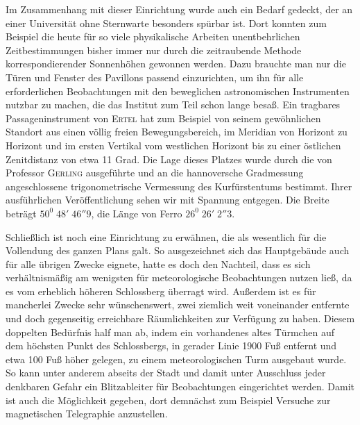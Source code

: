 Im Zusammenhang mit dieser Einrichtung wurde auch ein Bedarf gedeckt, der an einer Universität ohne Sternwarte besonders spürbar ist. Dort konnten zum Beispiel die heute für so viele physikalische Arbeiten unentbehrlichen Zeitbestimmungen bisher immer nur durch die zeitraubende Methode korrespondierender Sonnenhöhen gewonnen werden. Dazu brauchte man nur die Türen und Fenster des Pavillons passend einzurichten, um ihn für alle erforderlichen Beobachtungen mit den beweglichen astronomischen Instrumenten nutzbar zu machen, die das Institut zum Teil schon lange besaß. Ein tragbares Passageninstrument von \textsc{Ertel} hat zum Beispiel von seinem gewöhnlichen Standort aus einen völlig freien Bewegungsbereich, im Meridian von Horizont zu Horizont und im ersten Vertikal vom westlichen Horizont bis zu einer östlichen Zenitdistanz von etwa 11 Grad. Die Lage dieses Platzes
wurde durch die von Professor \textsc{Gerling} ausgeführte und an die hannoversche Gradmessung angeschlossene trigonometrische Vermessung des Kurfürstentums bestimmt. Ihrer ausführlichen Veröffentlichung sehen wir mit Spannung entgegen. Die Breite beträgt $50^0\;48'\;46''9$, die Länge von Ferro $26^0\;26'\;2''3$.

Schließlich ist noch eine Einrichtung zu erwähnen, die als wesentlich für die Vollendung des ganzen Plans galt. So ausgezeichnet sich das Hauptgebäude auch für alle übrigen Zwecke eignete, hatte es doch den Nachteil, dass es sich verhältnismäßig am wenigsten für meteorologische Beobachtungen nutzen ließ, da es vom erheblich höheren Schlossberg überragt wird. Außerdem ist es für mancherlei Zwecke sehr wünschenswert, zwei ziemlich weit voneinander entfernte und doch gegenseitig erreichbare Räumlichkeiten zur Verfügung zu haben. Diesem doppelten Bedürfnis half man ab, indem ein vorhandenes altes Türmchen auf dem höchsten Punkt des Schlossbergs, in gerader Linie 1900 Fuß entfernt und etwa 100 Fuß höher gelegen, zu einem meteorologischen Turm ausgebaut wurde. So kann unter anderem abseits der Stadt und damit unter Ausschluss jeder denkbaren Gefahr ein Blitzableiter für Beobachtungen eingerichtet werden. Damit ist auch die Möglichkeit gegeben, dort demnächst zum Beispiel Versuche zur magnetischen Telegraphie anzustellen.

